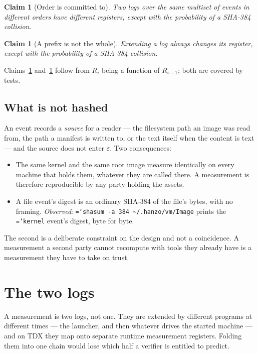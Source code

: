 \documentclass[11pt,a4paper]{article}
\newtheorem{claim}[definition]{Claim}
\newcommand{\code}[1]{\texttt{\hyphenchar\font=`\-\relax #1}}
\begin{document}
\begin{claim}[Order is committed to]
\label{cl:order}
Two logs over the same multiset of events in different orders have different
registers, except with the probability of a SHA-384 collision.
\end{claim}

\begin{claim}[A prefix is not the whole]
\label{cl:prefix}
Extending a log always changes its register, except with the probability of a
SHA-384 collision.
\end{claim}
\noindent Claims~\ref{cl:order} and~\ref{cl:prefix} follow from $R_i$ being a
function of $R_{i-1}$; both are covered by tests.

\subsection{What is not hashed}
\label{sec:notpath}

An event records a \emph{source} for a reader --- the filesystem path an image was
read from, the path a manifest is written to, or the text itself when the content
is text --- and the source does not enter $\varepsilon$. Two consequences:

\begin{itemize}
\item The same kernel and the same root image measure identically on every machine
  that holds them, whatever they are called there. A measurement is therefore
  reproducible by any party holding the assets.
\item A file event's digest is an ordinary SHA-384 of the file's bytes, with no
  framing. \emph{Observed}: \code{shasum -a 384 \textasciitilde/.hanzo/vm/Image}
  prints the \code{kernel} event's digest, byte for byte.
\end{itemize}

The second is a deliberate constraint on the design and not a coincidence. A
measurement a second party cannot recompute with tools they already have is a
measurement they have to take on trust.

\section{The two logs}
\label{sec:logs}

A measurement is two logs, not one. They are extended by different programs at
different times --- the launcher, and then whatever drives the started machine ---
and on TDX they map onto separate runtime measurement registers. Folding them
into one chain would lose which half a verifier is entitled to predict.
\end{document}
